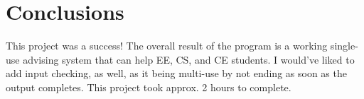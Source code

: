 \documentclass[12pt, letterpaper]{article}
\begin{document}
\section{Conclusions}
This project was a success! The overall result of the program is a working single-use advising system that can help EE, CS, and CE students. I would've liked to add input checking, as well, as it being multi-use by not ending as soon as the output completes. This project took approx. 2 hours to complete.
\end{document}

